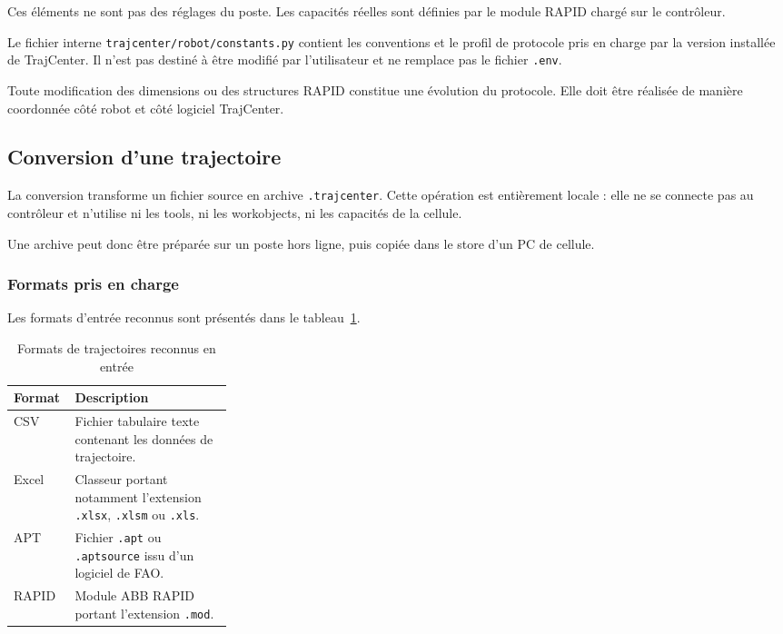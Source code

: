 \documentclass{rapportENSAM}
\begin{document}
Ces éléments ne sont pas des réglages du poste. Les capacités réelles sont
définies par le module RAPID chargé sur le contrôleur.

Le fichier interne
\texttt{trajcenter/robot/constants.py} contient les conventions et le profil
de protocole pris en charge par la version installée de TrajCenter. Il n'est
pas destiné à être modifié par l'utilisateur et ne remplace pas le fichier
\texttt{.env}.

Toute modification des dimensions ou des structures RAPID constitue une
évolution du protocole. Elle doit être réalisée de manière coordonnée côté
robot et côté logiciel TrajCenter.



\subsection{Conversion d'une trajectoire}
\label{subsec:pc-conversion}

La conversion transforme un fichier source en archive
\texttt{.trajcenter}. Cette opération est entièrement locale : elle ne se
connecte pas au contrôleur et n'utilise ni les tools, ni les workobjects, ni
les capacités de la cellule.

Une archive peut donc être préparée sur un poste hors ligne, puis copiée dans
le store d'un PC de cellule.

\subsubsection{Formats pris en charge}
\label{subsubsec:pc-conversion-formats}

Les formats d'entrée reconnus sont présentés dans le
tableau~\ref{tab:pc-input-formats}.

\begin{table}[ht]
    \centering
    \begin{tabularx}{\linewidth}{
        |p{0.28\linewidth}
        |X|
    }
        \hline
        \textbf{Format} &
        \textbf{Description} \\
        \hline

        CSV &
        Fichier tabulaire texte contenant les données de trajectoire. \\
        \hline

        Excel &
        Classeur portant notamment l'extension \texttt{.xlsx},
        \texttt{.xlsm} ou \texttt{.xls}. \\
        \hline

        APT &
        Fichier \texttt{.apt} ou \texttt{.aptsource} issu d'un logiciel de
        FAO. \\
        \hline

        RAPID &
        Module ABB RAPID portant l'extension \texttt{.mod}. \\
        \hline
    \end{tabularx}
    \caption{Formats de trajectoires reconnus en entrée}
    \label{tab:pc-input-formats}
\end{table}
\end{document}
